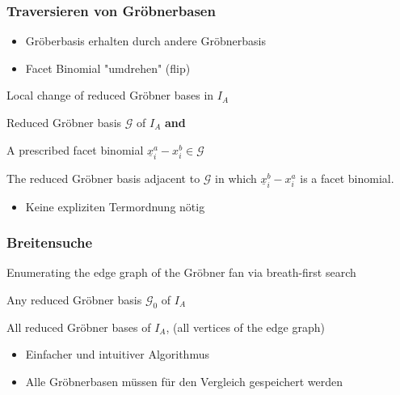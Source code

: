 \documentclass{beamer}
\newcommand{\Input}{\item[\algorithmicinput]}
\newcommand{\algorithmicinput}{\textbf{Input:}}
\newcommand{\Output}{\item[\algorithmicoutput]}
\newcommand{\algorithmicoutput}{\textbf{Output:}}
\begin{document}
\begin{frame}
\frametitle{Traversieren von Gröbnerbasen}
\begin{itemize}
\item Gröberbasis erhalten durch andere Gröbnerbasis
\item Facet Binomial "umdrehen" (flip)
\end{itemize}


\begin{algorithm}[H]
\caption{Local change of reduced Gröbner bases in $I_A$ }
\label{alg:flip}
\begin{algorithmic}[1]

\Input
Reduced Gröbner basis $ \mathcal{G} $ of $I_A$ \textbf{and}

    A prescribed facet binomial $ \underline{x}^{a}_{i} - x^{b}_{i} \in \mathcal{G} $
\Output The reduced Gröbner basis adjacent to $\mathcal{G}$ in which $ \underline{x}^{b}_{i} - x^{a}_{i} $ is a facet binomial.


\end{algorithmic}
\end{algorithm}

\begin{itemize}
\item Keine expliziten Termordnung nötig

\end{itemize}

	
\end{frame}


\begin{frame}[fragile]
\frametitle{Breitensuche}


\begin{algorithm}[H]
\caption{Enumerating the edge graph of the Gröbner fan via breath-first search}
\label{alg:breath}
\begin{algorithmic}[1]

\Input
Any reduced Gröbner basis $ \mathcal{G}_0 $ of $I_A$
\Output All reduced Gröbner bases of $I_A$, (all vertices of the edge graph)

\end{algorithmic}
\end{algorithm}

\begin{itemize}
\item Einfacher und intuitiver Algorithmus
\item Alle Gröbnerbasen müssen für den Vergleich gespeichert werden
\end{itemize}
 
\end{frame}
\end{document}
